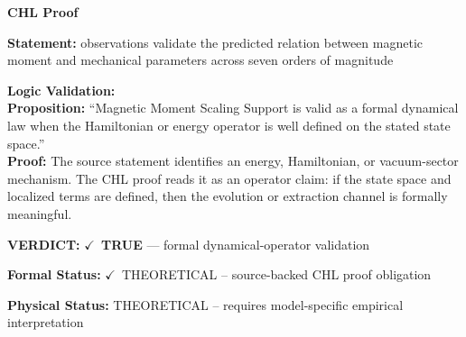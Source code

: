 \vspace{0.45em}
\noindent\textbf{CHL Proof}\par
\textbf{Statement:} observations validate the predicted relation between magnetic moment and mechanical
parameters across seven orders of magnitude

\textbf{Logic Validation:}\\
\textbf{Proposition:} ``Magnetic Moment Scaling Support is valid as a formal dynamical law when the Hamiltonian
or energy operator is well defined on the stated state space.''\\
\textbf{Proof:} The source statement identifies an energy, Hamiltonian, or vacuum-sector mechanism. The
CHL proof reads it as an operator claim: if the state space and localized terms are
defined, then the evolution or extraction channel is formally meaningful.

\textbf{VERDICT:} \ensuremath{\checkmark}\ \textbf{TRUE} --- formal dynamical-operator validation

\textbf{Formal Status:} \ensuremath{\checkmark}\ THEORETICAL -- source-backed CHL proof obligation

\textbf{Physical Status:} THEORETICAL -- requires model-specific empirical interpretation
\par\vspace{0.45em}
\par
\ifTZPDarkEdition
{}
\fi
\endgroup
\endgroup
